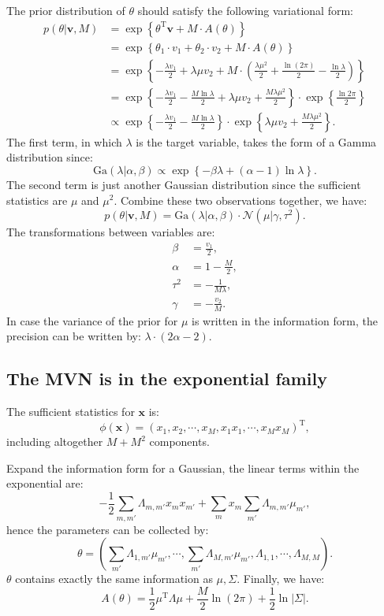 \documentclass[UTF8]{ctexart}
\begin{document}
The prior distribution of $\theta$ should satisfy the following variational form:
$$
\begin{aligned}
p(\theta|\textbf{v},M)&=\exp\left\{\theta^{\text{T}}\textbf{v}+M\cdot A(\theta) \right\}\\
&=\exp\left\{ \theta_{1}\cdot v_{1}+\theta_{2}\cdot v_{2}+M\cdot A(\theta)\right\}\\
&=\exp\left\{-\frac{\lambda v_{1}}{2}+\lambda\mu v_{2}+M\cdot \left(\frac{\lambda\mu^{2}}{2}+\frac{\ln (2\pi)}{2}-\frac{\ln \lambda}{2}\right)\right\}\\
&=\exp\left\{-\frac{\lambda v_{1}}{2}-\frac{M\ln \lambda}{2}+\lambda\mu v_{2}+\frac{M\lambda \mu^{2}}{2} \right\}\cdot \exp\left\{\frac{\ln 2\pi}{2} \right\}\\
&\propto \exp\left\{-\frac{\lambda v_{1}}{2}-\frac{M\ln \lambda}{2}\right\}\cdot\exp\left\{ \lambda\mu v_{2}+\frac{M\lambda \mu^{2}}{2} \right\}.
\end{aligned}
$$
The first term, in which $\lambda$ is the target variable, takes the form of a Gamma distribution since:
$$\text{Ga}(\lambda|\alpha,\beta)\propto \exp\left\{-\beta\lambda+(\alpha-1)\ln \lambda \right\}.$$
The second term is just another Gaussian distribution since the sufficient statistics are $\mu$ and $\mu^{2}$.
Combine these two observations together, we have:
$$p(\theta|\textbf{v},M)=\text{Ga}(\lambda|\alpha,\beta)\cdot\mathcal{N}(\mu|\gamma,\tau^{2}).$$
The transformations between variables are:
$$
\begin{aligned}
\beta &=\frac{v_{1}}{2},\\
\alpha &=1-\frac{M}{2},\\
\tau^{2} &=-\frac{1}{M\lambda},\\
\gamma&=-\frac{v_{2}}{M}.
\end{aligned}
$$
In case the variance of the prior for $\mu$ is written in the information form, the precision can be written by: $\lambda\cdot(2\alpha-2)$.


\subsection{The MVN is in the exponential family}
The sufficient statistics for $\textbf{x}$ is:
$$\phi(\textbf{x})=(x_{1},x_{2},\cdots,x_{M},x_{1}x_{1},\cdots,x_{M}x_{M})^{\text{T}},$$
including altogether $M+M^{2}$ components.

Expand the information form for a Gaussian, the linear terms within the exponential are:
$$-\frac{1}{2}\sum_{m,m'}\Lambda_{m,m'}x_{m}x_{m'}+\sum_{m}x_{m}\sum_{m'}\Lambda_{m,m'}\mu_{m'},$$
hence the parameters can be collected by:
$$\theta=(\sum_{m'}\Lambda_{1,m'}\mu_{m'},\cdots,\sum_{m'}\Lambda_{M,m'}\mu_{m'},\Lambda_{1,1},\cdots,\Lambda_{M,M}).$$
$\theta$ contains exactly the same information as $\mu,\Sigma$.
Finally, we have:
$$A(\theta)=\frac{1}{2}\mu^{\text{T}}\Lambda\mu+\frac{M}{2}\ln (2\pi)+\frac{1}{2}\ln |\Sigma|.$$
\end{document}
